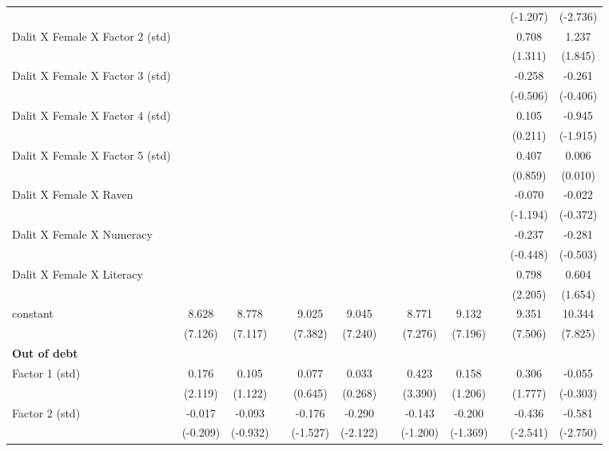 {\begin{longtable}{@{\extracolsep{\fill}}lccccccccccc}
      &   &   &   &   &   &   &   &   &   & (-1.207) & (-2.736) \\
    Dalit X Female X Factor 2 (std) &   &   &   &   &   &   &   &   &   & 0.708 & 1.237 \\
      &   &   &   &   &   &   &   &   &   & (1.311) & (1.845) \\
    Dalit X Female X Factor 3 (std) &   &   &   &   &   &   &   &   &   & -0.258 & -0.261 \\
      &   &   &   &   &   &   &   &   &   & (-0.506) & (-0.406) \\
    Dalit X Female X Factor 4 (std) &   &   &   &   &   &   &   &   &   & 0.105 & -0.945 \\
      &   &   &   &   &   &   &   &   &   & (0.211) & (-1.915) \\
    Dalit X Female X Factor 5 (std) &   &   &   &   &   &   &   &   &   & 0.407 & 0.006 \\
      &   &   &   &   &   &   &   &   &   & (0.859) & (0.010) \\
    Dalit X Female X Raven &   &   &   &   &   &   &   &   &   & -0.070 & -0.022 \\
      &   &   &   &   &   &   &   &   &   & (-1.194) & (-0.372) \\
    Dalit X Female X Numeracy &   &   &   &   &   &   &   &   &   & -0.237 & -0.281 \\
      &   &   &   &   &   &   &   &   &   & (-0.448) & (-0.503) \\
    Dalit X Female X Literacy &   &   &   &   &   &   &   &   &   & 0.798 & 0.604 \\
      &   &   &   &   &   &   &   &   &   & (2.205) & (1.654) \\
    constant & 8.628 & 8.778 &   & 9.025 & 9.045 &   & 8.771 & 9.132 &   & 9.351 & 10.344 \\
      & (7.126) & (7.117) &   & (7.382) & (7.240) &   & (7.276) & (7.196) &   & (7.506) & (7.825) \\
    \midrule
    \textbf{Out of debt} &   &   &   &   &   &   &   &   &   &   &  \\
    Factor 1 (std) & 0.176 & 0.105 &   & 0.077 & 0.033 &   & 0.423 & 0.158 &   & 0.306 & -0.055 \\
      & (2.119) & (1.122) &   & (0.645) & (0.268) &   & (3.390) & (1.206) &   & (1.777) & (-0.303) \\
    Factor 2 (std) & -0.017 & -0.093 &   & -0.176 & -0.290 &   & -0.143 & -0.200 &   & -0.436 & -0.581 \\
      & (-0.209) & (-0.932) &   & (-1.527) & (-2.122) &   & (-1.200) & (-1.369) &   & (-2.541) & (-2.750) \\

\end{longtable}}
